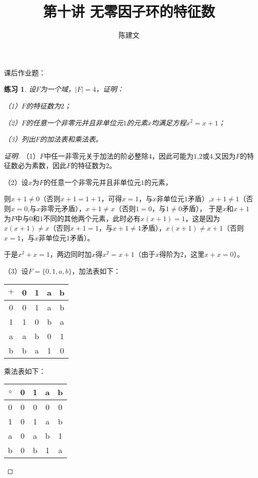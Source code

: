 \documentclass{article}
\newtheorem{Exercise}{练习}
\begin{document}
\begin{CJK*}{UTF8}{gbsn}
  \title{第十讲 无零因子环的特征数}
  \author{陈建文}
  \maketitle
  


课后作业题：
\begin{Exercise}
设$F$为一个域，$|F|=4$，证明：

（1）$F$的特征数为$2$；

（2）$F$的任意一个非零元并且非单位元$1$的元素$x$均满足方程$x^2=x+1$；

（3）列出$F$的加法表和乘法表。
\end{Exercise}
\begin{proof}[证明]

  （1）$F$中任一非零元关于加法的阶必整除$4$，因此可能为$1$,$2$或$4$,又因为$F$的特征数必为素数，因此$F$的特征数为$2$。

  （2）设$x$为$F$的任意一个非零元并且非单位元$1$的元素，

  则$x+1\neq 0$（否则$x+1=1+1$，可得$x=1$，与$x$非单位元$1$矛盾）,$x+1\neq 1$（否则$x=0$,与$x$非零元矛盾），$x+1\neq x$（否则$1=0$，与$1\neq 0$矛盾），
  于是$x$和$x+1$为$F$中与$0$和$1$不同的其他两个元素，此时必有$x(x+1)=1$，这是因为$x(x+1)\neq x$（否则$x+1=1$，与$x+1\neq 1$矛盾），$x(x+1)\neq x+1$（否则$x=1$，与$x$非单位元$1$矛盾）。

  于是$x^2+x=1$，两边同时加$x$得$x^2=x+1$（由于$x$得阶为$2$，这里$x+x=0$）。

  （3）设$F=\{0,1,a,b\}$，加法表如下：

  \begin{tabular}{c|cccc}
    $+$&0&1&a&b\\
    \hline
  0&0&1&a&b\\
  1&1&0&b&a\\
  a&a&b&0&1\\
  b&b&a&1&0\\
  \end{tabular}

  乘法表如下：

  \begin{tabular}{c|cccc}
    $\circ$&0&1&a&b\\
    \hline
  0&0&0&0&0\\
  1&0&1&a&b\\
  a&0&a&b&1\\
  b&0&b&1&a\\
  \end{tabular}

\end{proof}


\end{CJK*}
\end{document}
